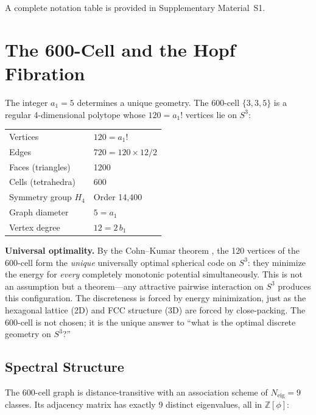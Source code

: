 \documentclass[12pt,a4paper]{article}
\theoremstyle{definition}
\begin{document}
A complete notation table is provided in Supplementary Material~S1.



\section{The 600-Cell and the Hopf Fibration}
\label{sec:geometry}

The integer $a_1 = 5$ determines a unique geometry.  The 600-cell $\{3,3,5\}$ is a regular 4-dimensional polytope whose $120 = a_1!$ vertices lie on $S^3$:

\begin{center}
\begin{tabular}{ll}
\toprule
Vertices & $120 = a_1!$ \\
Edges & $720 = 120 \times 12 / 2$ \\
Faces (triangles) & 1200 \\
Cells (tetrahedra) & 600 \\
Symmetry group $H_4$ & Order 14,400 \\
Graph diameter & $5 = a_1$ \\
Vertex degree & $12 = 2\,b_1$ \\
\bottomrule
\end{tabular}
\end{center}

\textbf{Universal optimality.} By the Cohn--Kumar theorem \cite{cohn2007,cohn2022}, the 120 vertices of the 600-cell form the \emph{unique} universally optimal spherical code on $S^3$: they minimize the energy for \emph{every} completely monotonic potential simultaneously. This is not an assumption but a theorem---any attractive pairwise interaction on $S^3$ produces this configuration. The discreteness is forced by energy minimization, just as the hexagonal lattice (2D) and FCC structure (3D) are forced by close-packing. The 600-cell is not chosen; it is the unique answer to ``what is the optimal discrete geometry on $S^3$?''

\subsection{Spectral Structure}

The 600-cell graph is distance-transitive with an association scheme of $N_{\text{eig}} = 9$ classes. Its adjacency matrix has exactly 9 distinct eigenvalues, all in $\mathbb{Z}[\phi]$:
\end{document}
